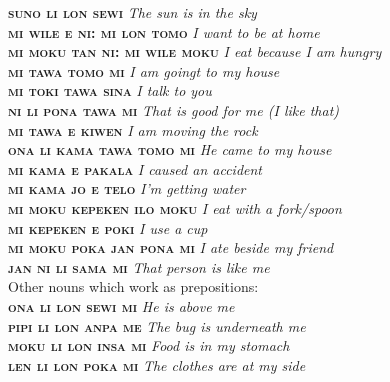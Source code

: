 \documentclass[10pt,a4paper]{article}
\begin{document}
\begin{multicols}{2}
\noindent\textbf{\textsc{suno li lon sewi}} \textit{The sun is in the sky}\\
\noindent\textbf{\textsc{mi wile e ni: mi lon tomo}} \textit{I want to be at home}\\

\noindent\textbf{\textsc{mi moku tan ni: mi wile moku}} \textit{I eat because I am hungry}\\

\noindent\textbf{\textsc{mi tawa tomo mi}} \textit{I am goingt to my house}\\
\noindent\textbf{\textsc{mi toki tawa sina}} \textit{I talk to you}\\
\noindent\textbf{\textsc{ni li pona tawa mi}} \textit{That is good for me (I like that)}\\
\noindent\textbf{\textsc{mi tawa e kiwen}} \textit{I am moving the rock}\\

\noindent\textbf{\textsc{ona li kama tawa tomo mi}} \textit{He came to my house}\\
\noindent\textbf{\textsc{mi kama e pakala}} \textit{I caused an accident}\\
\noindent\textbf{\textsc{mi kama jo e telo}} \textit{I'm getting water}\\

\noindent\textbf{\textsc{mi moku kepeken ilo moku}} \textit{I eat with a fork/spoon}\\
\noindent\textbf{\textsc{mi kepeken e poki}} \textit{I use a cup}\\

\noindent\textbf{\textsc{mi moku poka jan pona mi}} \textit{I ate beside my friend}\\

\noindent\textbf{\textsc{jan ni li sama mi}} \textit{That person is like me}\\

\noindent Other nouns which work as prepositions:\\
\noindent\textbf{\textsc{ona li lon sewi mi}} \textit{He is above me}\\
\noindent\textbf{\textsc{pipi li lon anpa me}} \textit{The bug is underneath me}\\
\noindent\textbf{\textsc{moku li lon insa mi}} \textit{Food is in my stomach}\\
\noindent\textbf{\textsc{len li lon poka mi}} \textit{The clothes are at my side}
\end{multicols}
\end{document}
